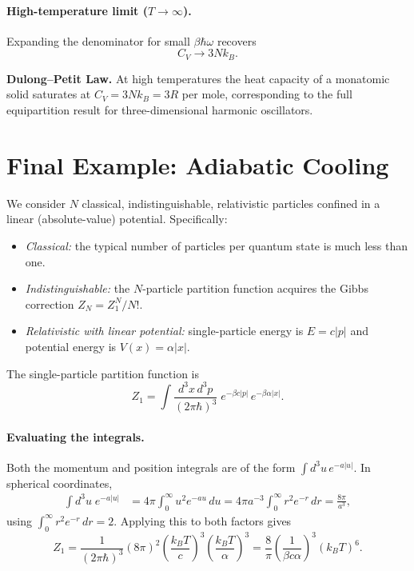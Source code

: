 \paragraph{High-temperature limit ($T\to\infty$).}  Expanding the denominator for small
$\beta\hbar\omega$ recovers
\begin{equation}
    C_V \to 3Nk_B.
\end{equation}

\begin{fact}
\textbf{Dulong--Petit Law.}  At high temperatures the heat capacity of a monatomic
solid saturates at $C_V = 3Nk_B = 3R$ per mole, corresponding to the full
equipartition result for three-dimensional harmonic oscillators.
\end{fact}

\section{Final Example: Adiabatic Cooling}

We consider $N$ classical, indistinguishable, relativistic particles confined in a
linear (absolute-value) potential.  Specifically:
\begin{itemize}
    \item \textit{Classical:} the typical number of particles per quantum state is
          much less than one.
    \item \textit{Indistinguishable:} the $N$-particle partition function acquires
          the Gibbs correction $Z_N = Z_1^N / N!$.
    \item \textit{Relativistic with linear potential:} single-particle energy is
          $E = c|p|$ and potential energy is $V(x)=\alpha|x|$.
\end{itemize}

The single-particle partition function is
\begin{equation}
    Z_1 = \int \frac{d^3x\, d^3p}{(2\pi\hbar)^3}\;
    e^{-\beta c|p|}\, e^{-\beta\alpha|x|}.
\end{equation}

\paragraph{Evaluating the integrals.}  Both the momentum and position integrals are
of the form $\int d^3u\, e^{-a|u|}$.  In spherical coordinates,
\begin{align}
    \int d^3u\; e^{-a|u|}
    &= 4\pi \int_0^\infty u^2 e^{-au}\,du
     = 4\pi a^{-3} \int_0^\infty r^2 e^{-r}\,dr
     = \frac{8\pi}{a^3},
\end{align}
using $\int_0^\infty r^2 e^{-r}\,dr = 2$.  Applying this to both factors gives
\begin{equation}
    Z_1 = \frac{1}{(2\pi\hbar)^3}(8\pi)^2
    \left(\frac{k_BT}{c}\right)^{\!3}\!\left(\frac{k_BT}{\alpha}\right)^{\!3}
    = \frac{8}{\pi}\!\left(\frac{1}{\beta c\alpha}\right)^{\!3}(k_BT)^6.
\end{equation}

